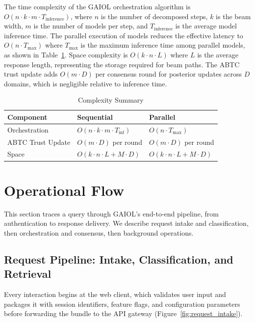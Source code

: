 \documentclass{iopjournal}
\begin{document}
The time complexity of the GAIOL orchestration algorithm is $O(n \cdot k \cdot m \cdot T_{\text{inference}})$, where $n$ is the number of decomposed steps, $k$ is the beam width, $m$ is the number of models per step, and $T_{\text{inference}}$ is the average model inference time. The parallel execution of models reduces the effective latency to $O(n \cdot T_{\max})$ where $T_{\max}$ is the maximum inference time among parallel models, as shown in Table~\ref{tab:complexity}. Space complexity is $O(k \cdot n \cdot L)$ where $L$ is the average response length, representing the storage required for beam paths. The ABTC trust update adds $O(m \cdot D)$ per consensus round for posterior updates across $D$ domains, which is negligible relative to inference time.
\begin{table}[H]
\centering
\caption{Complexity Summary}
\label{tab:complexity}
\begin{tabular}{lll}
\toprule
\textbf{Component} & \textbf{Sequential} & \textbf{Parallel} \\
\midrule
Orchestration & $O(n \cdot k \cdot m \cdot T_{\text{inf}})$ & $O(n \cdot T_{\max})$ \\

ABTC Trust Update 
& $O(m \cdot D)$ per round 
& $O(m \cdot D)$ per round \\

Space 
& $O(k \cdot n \cdot L + M \cdot D)$ 
& $O(k \cdot n \cdot L + M \cdot D)$ \\

\bottomrule
\end{tabular}
\end{table}

\section{Operational Flow}
\label{sec:flow}
\FloatBarrier

This section traces a query through GAIOL's end-to-end pipeline, from authentication to response delivery. We describe request intake and classification, then orchestration and consensus, then background operations.

\subsection{Request Pipeline: Intake, Classification, and Retrieval}

Every interaction begins at the web client, which validates user input and packages it with session identifiers, feature flags, and configuration parameters before forwarding the bundle to the API gateway (Figure~\ref{fig:request_intake}).
\end{document}
